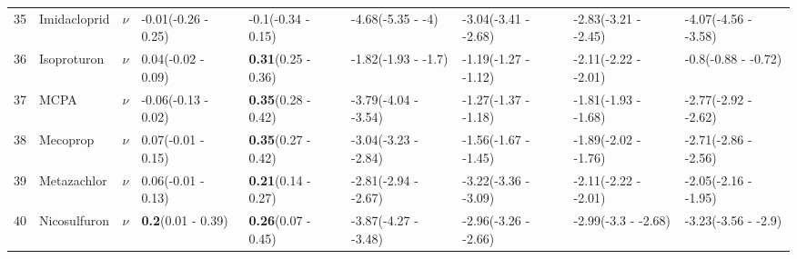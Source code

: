 \begin{longtable}{lp{2cm}p{0.6cm}p{1.8cm}p{1.8cm}p{1.8cm}p{1.8cm}p{1.8cm}p{1.8cm}}
  35 & Imidacloprid & $\nu$ & -0.01\newline (-0.26 - 0.25) & -0.1\newline (-0.34 - 0.15) & -4.68\newline (-5.35 - -4) & -3.04\newline (-3.41 - -2.68) & -2.83\newline (-3.21 - -2.45) & -4.07\newline (-4.56 - -3.58) \\ 
  36 & Isoproturon & $\nu$ & 0.04\newline (-0.02 - 0.09) & \textbf{0.31}\newline (0.25 - 0.36) & -1.82\newline (-1.93 - -1.7) & -1.19\newline (-1.27 - -1.12) & -2.11\newline (-2.22 - -2.01) & -0.8\newline (-0.88 - -0.72) \\ 
  37 & MCPA & $\nu$ & -0.06\newline (-0.13 - 0.02) & \textbf{0.35}\newline (0.28 - 0.42) & -3.79\newline (-4.04 - -3.54) & -1.27\newline (-1.37 - -1.18) & -1.81\newline (-1.93 - -1.68) & -2.77\newline (-2.92 - -2.62) \\ 
  38 & Mecoprop & $\nu$ & 0.07\newline (-0.01 - 0.15) & \textbf{0.35}\newline (0.27 - 0.42) & -3.04\newline (-3.23 - -2.84) & -1.56\newline (-1.67 - -1.45) & -1.89\newline (-2.02 - -1.76) & -2.71\newline (-2.86 - -2.56) \\ 
  39 & Metazachlor & $\nu$ & 0.06\newline (-0.01 - 0.13) & \textbf{0.21}\newline (0.14 - 0.27) & -2.81\newline (-2.94 - -2.67) & -3.22\newline (-3.36 - -3.09) & -2.11\newline (-2.22 - -2.01) & -2.05\newline (-2.16 - -1.95) \\ 
  40 & Nicosulfuron & $\nu$ & \textbf{0.2}\newline (0.01 - 0.39) & \textbf{0.26}\newline (0.07 - 0.45) & -3.87\newline (-4.27 - -3.48) & -2.96\newline (-3.26 - -2.66) & -2.99\newline (-3.3 - -2.68) & -3.23\newline (-3.56 - -2.9) \\ 

\end{longtable}
